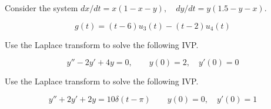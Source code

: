 \documentclass[12pt]{exam}
\begin{document}
\begin{questions}
    

\newpage \InitialsRight
    \question[10] 
    Consider the system $\displaystyle dx/dt = x(1-x-y), \quad dy/dt = y(1.5-y-x)$. %
    

    
    

    


    
    
    $$g(t) = (t-6)u_3(t)  - (t - 2)u_4(t) $$ %

\newpage \InitialsLeft

    \question[10] Use the Laplace transform to solve the following IVP.

    $$\displaystyle y''-2y'+4y=0,\qquad y(0)=2,\quad y'(0)=0$$ %
    

\newpage \InitialsRight

    \question[10] Use the Laplace transform to solve the following IVP.

    $$\displaystyle y''+2y'+2y=10\delta(t-\pi)\qquad y(0)=0,\quad y'(0)=1 $$ %



    
\end{questions}
\end{document}
